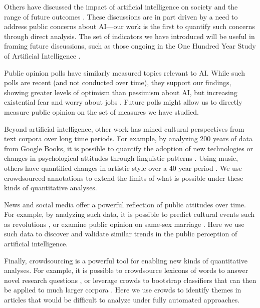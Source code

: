 \documentclass[letterpaper]{article}
\begin{document}
Others have discussed the impact of artificial intelligence on society and the range of future outcomes \cite{ai-concerns}. These discussions are in part driven by a need to address public concerns about AI---our work is the first to quantify such concerns through direct analysis. The set of indicators we have introduced will be useful in framing future discussions, such as those ongoing in the One Hundred Year Study of Artificial Intelligence \cite{100years}.

Public opinion polls have similarly measured topics relevant to AI. While such polls are recent (and not conducted over time), they support our findings, showing greater levels of optimism than pessimism about AI, but increasing existential fear and worry about jobs \cite{bsa-poll,cbs-poll}. Future polls might allow us to directly measure public opinion on the set of measures we have studied.

Beyond artificial intelligence, other work has mined cultural perspectives from text corpora over long time periods. For example, by analyzing 200 years of data from Google Books, it is possible to quantify the adoption of new technologies or changes in psychological attitudes through linguistic patterns \cite{google-culture,psych-culture}. Using music, others have quantified changes in artistic style over a 40 year period \cite{music-over-time}. We use crowdsourced annotations to extend the limits of what is possible under these kinds of quantitative analyses.


News and social media offer a powerful reflection of public attitudes over time. For example, by analyzing such data, it is possible to predict cultural events such as revolutions \cite{future1,future2}, or examine public opinion on same-sex marriage \cite{marriage}. Here we use such data to discover and validate similar trends in the public perception of artificial intelligence.

Finally, crowdsourcing is a powerful tool for enabling new kinds of quantitative analyses. For example, it is possible to crowdsource lexicons of words to answer novel research questions \cite{empath}, or leverage crowds to bootstrap classifiers that can then be applied to much larger corpora \cite{politeness,dogmatism}. Here we use crowds to identify themes in articles that would be difficult to analyze under fully automated approaches.
\end{document}
